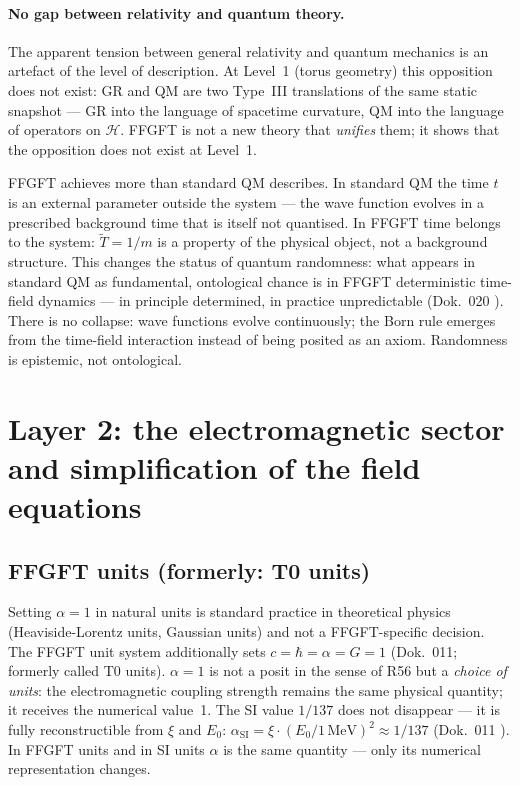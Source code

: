 \paragraph{No gap between relativity and quantum theory.}
The apparent tension between general relativity and quantum mechanics is an
artefact of the level of description. At Level~1 (torus geometry) this
opposition does not exist: GR and QM are two Type~III translations of the
same static snapshot --- GR into the language of spacetime curvature, QM
into the language of operators on $\mathcal{H}$. FFGFT is not a new theory
that \emph{unifies} them; it shows that the opposition does not exist at
Level~1.

FFGFT achieves more than standard QM describes. In standard QM the time $t$
is an external parameter outside the system --- the wave function evolves in
a prescribed background time that is itself not quantised. In FFGFT time
belongs to the system: $\tilde T=1/m$ is a property of the physical object,
not a background structure. This changes the status of quantum randomness:
what appears in standard QM as fundamental, ontological chance is in FFGFT
deterministic time-field dynamics --- in principle determined, in practice
unpredictable (Dok.~020 \KM). There is no collapse: wave functions evolve
continuously; the Born rule emerges from the time-field interaction instead
of being posited as an axiom. Randomness is epistemic, not ontological.

\section{Layer 2: the electromagnetic sector and simplification of the field equations}

\subsection*{FFGFT units (formerly: T0 units)}

Setting $\alpha=1$ in natural units is standard practice in theoretical physics
(Heaviside-Lorentz units, Gaussian units) and not a FFGFT-specific decision.
The FFGFT unit system additionally sets $c=\hbar=\alpha=G=1$ (Dok.~011;
formerly called T0 units). $\alpha=1$ is not a posit in the sense of R56 but a
\emph{choice of units}: the electromagnetic coupling strength remains the same
physical quantity; it receives the numerical value~1. The SI value $1/137$ does
not disappear --- it is fully reconstructible from $\xi$ and $E_0$:
$\alpha_{\mathrm{SI}}=\xi\cdot(E_0/1\,\mathrm{MeV})^2\approx1/137$ (Dok.~011
\KM). In FFGFT units and in SI units $\alpha$ is the same quantity --- only its
numerical representation changes.

